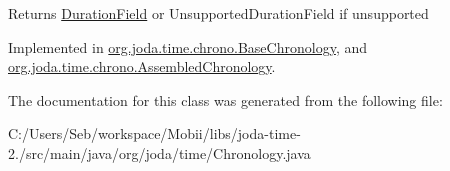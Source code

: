\begin{DoxyReturn}{Returns}
\hyperlink{classorg_1_1joda_1_1time_1_1_duration_field}{Duration\-Field} or Unsupported\-Duration\-Field if unsupported 
\end{DoxyReturn}


Implemented in \hyperlink{classorg_1_1joda_1_1time_1_1chrono_1_1_base_chronology_a03ccdd0e8218fde87d7d97187c5f6698}{org.\-joda.\-time.\-chrono.\-Base\-Chronology}, and \hyperlink{classorg_1_1joda_1_1time_1_1chrono_1_1_assembled_chronology_a3d60a1bad4668418d8882333e722de69}{org.\-joda.\-time.\-chrono.\-Assembled\-Chronology}.



The documentation for this class was generated from the following file\-:\begin{DoxyCompactItemize}
\item 
C\-:/\-Users/\-Seb/workspace/\-Mobii/libs/joda-\/time-\/2./src/main/java/org/joda/time/Chronology.\-java\end{DoxyCompactItemize}
